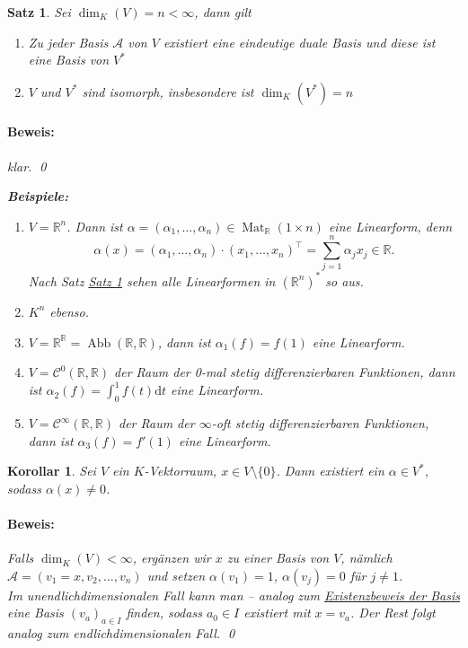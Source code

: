 \documentclass{report}
\newcommand{\R}{\mathbb{R}}
\newcommand{\al}{\alpha}
\newcommand{\basea}{\mathcal{A}}
\DeclareMathOperator{\abb}{Abb}
\DeclareMathOperator{\Mat}{Mat}
\theoremstyle{customrem}
\theoremstyle{customdef}
\newtheorem{korrolar}[definition]{Korollar}
\newtheorem{satz}[definition]{Satz}
\renewenvironment{proof}{\paragraph{Beweis: }}{\qed}
\theoremstyle{customenv}
\begin{document}
	\begin{satz}
		\label{satz52}
		Sei \(\dim_K(V)=n<\infty\), dann gilt
		\begin{enumerate}[label=\roman*)]
			\item Zu jeder Basis \(\basea\) von \(V\) existiert eine eindeutige duale Basis und diese ist eine Basis von \(V^\ast\)
			\item \(V\) und \(V^\ast\) sind isomorph, insbesondere ist \(\dim_K(V^\ast)=n\)
		\end{enumerate}
		\begin{proof}
			klar.
		\end{proof}

		\vspace{.2cm}
		\textbf{Beispiele:}
		\begin{enumerate}[label=\roman*)]
			\item \(V=\R^n\). Dann ist \(\al=(\al_1,\ldots, \al_n)\in\Mat_\R(1\times n)\) eine Linearform, denn \[\al(x)=(\al_1,\ldots, \al_n)\cdot(x_1,\ldots, x_n)^\top = \sum_{j=1}^{n}\al_jx_j\in\R.\] Nach Satz \hyperref[satz52]{Satz \ref*{satz52}} sehen alle Linearformen in \((\R^n)^\ast\) so aus.
			\item \(K^n\) ebenso.
			\item \(V=\R^\R=\abb(\R, \R)\), dann ist \(\al_1(f)=f(1)\) eine Linearform.
			\item \(V=\mathcal{C}^0(\R, \R)\) der Raum der 0-mal stetig differenzierbaren Funktionen, dann ist \(\al_2(f)=\int_0^1f(t)\mathrm{d}t\) eine Linearform.
			\item \(V=\mathcal{C}^\infty(\R, \R)\) der Raum der \(\infty\)-oft stetig differenzierbaren Funktionen, dann ist \(\al_3(f)=f'(1)\) eine Linearform.
		\end{enumerate}
	\end{satz}
	\pagebreak[4]
	\begin{korrolar}
		\label{kor53}
		Sei \(V\) ein \(K\)-Vektorraum, \(x\in V\setminus\{0\}\). Dann existiert ein \(\al\in V^\ast\), sodass \(\al(x)\neq 0\).
		\begin{proof}
			Falls \(\dim_K(V)<\infty\), ergänzen wir \(x\) zu einer Basis von \(V\), nämlich \(\basea=(v_1=x, v_2,\ldots, v_n)\) und setzen \(\al(v_1)=1\), \(\al(v_j)=0\) für \(j\neq 1\).\\

			Im unendlichdimensionalen Fall kann man -- analog zum \hyperref[satz220]{Existenzbeweis der Basis} eine Basis \((v_a)_{a\in I}\) finden, sodass \(a_0\in I\) existiert mit \(x=v_a\). Der Rest folgt analog zum endlichdimensionalen Fall.
		\end{proof}
	\end{korrolar}
\end{document}

